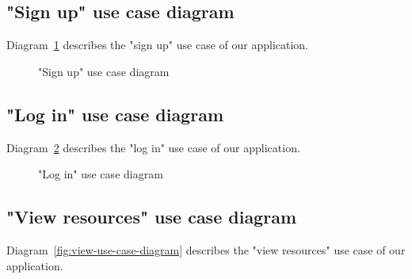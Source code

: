 \subsection{"Sign up" use case diagram}
Diagram~\ref{fig:signup-use-case-diagram} describes the "sign up" use case of our application.

\begin{figure}[h]
	\centerfloat

	\caption{"Sign up" use case diagram}
	\label{fig:signup-use-case-diagram}
\end{figure}

\subsection{"Log in" use case diagram}
Diagram~\ref{fig:login-use-case-diagram} describes the "log in" use case of our application.

\begin{figure}[h]
	\centerfloat

	\caption{"Log in" use case diagram}
	\label{fig:login-use-case-diagram}
\end{figure}

\subsection{"View resources" use case diagram}
Diagram~\ref{fig:view-use-case-diagram} describes the "view resources" use case of our application.

